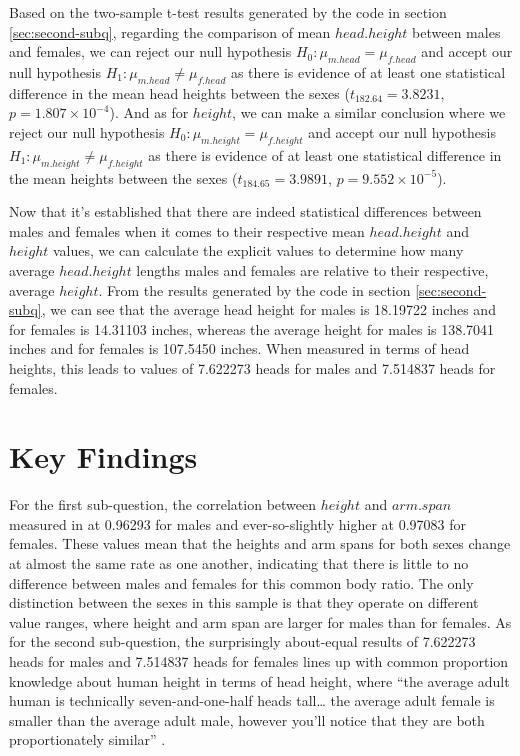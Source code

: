 \documentclass[]{article}
\begin{document}
Based on the two-sample t-test results generated by the code in section
\ref{sec:second-subq}, regarding the comparison of mean \(head.height\)
between males and females, we can reject our null hypothesis
\(H_0: \mu_{m.head}=\mu_{f.head}\) and accept our null hypothesis
\(H_1: \mu_{m.head} \neq \mu_{f.head}\) as there is evidence of at least
one statistical difference in the mean head heights between the sexes
(\(t_{182.64}=3.8231\), \(p=1.807\times10^{-4}\)). And as for
\(height\), we can make a similar conclusion where we reject our null
hypothesis \(H_0: \mu_{m.height}=\mu_{f.height}\) and accept our null
hypothesis \(H_1: \mu_{m.height} \neq \mu_{f.height}\) as there is
evidence of at least one statistical difference in the mean heights
between the sexes (\(t_{184.65}=3.9891\), \(p=9.552\times10^{-5}\)).

\vspace{0.25cm}

Now that it's established that there are indeed statistical differences
between males and females when it comes to their respective mean
\(head.height\) and \(height\) values, we can calculate the explicit
values to determine how many average \(head.height\) lengths males and
females are relative to their respective, average \(height\). From the
results generated by the code in section \ref{sec:second-subq}, we can
see that the average head height for males is 18.19722 inches and for
females is 14.31103 inches, whereas the average height for males is
138.7041 inches and for females is 107.5450 inches. When measured in
terms of head heights, this leads to values of 7.622273 heads for males
and 7.514837 heads for females.

\newpage

\section{Key Findings}
\label{sec:findings}

For the first sub-question, the correlation between \(height\) and
\(arm.span\) measured in at 0.96293 for males and ever-so-slightly
higher at 0.97083 for females. These values mean that the heights and
arm spans for both sexes change at almost the same rate as one another,
indicating that there is little to no difference between males and
females for this common body ratio. The only distinction between the
sexes in this sample is that they operate on different value ranges,
where height and arm span are larger for males than for females. As for
the second sub-question, the surprisingly about-equal results of
7.622273 heads for males and 7.514837 heads for females lines up with
common proportion knowledge about human height in terms of head height,
where \enquote{the average adult human is technically seven-and-one-half
heads tall\ldots{} the average adult female is smaller than the average
adult male, however you'll notice that they are both proportionately
similar} \citep{Larson:2014}.
\end{document}
